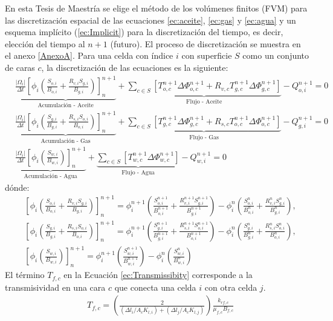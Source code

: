 En esta Tesis de Maestría se elige el método de los volúmenes finitos (FVM) para las discretización espacial de las ecuaciones \ref{ec:aceite}, \ref{ec:gas} y \ref{ec:agua} y un esquema implícito (\ref{ec:Implicit}) para la discretización del tiempo, es decir, elección del tiempo al $n+1$ (futuro). El proceso de discretización se muestra en el anexo \ref{AnexoA}. Para una celda con índice $i$ con superficie $S$ como un conjunto de caras $c$, la discretización de las ecuaciones es la siguiente:
\begin{align}
\label{ec:aceiteDiscretizacion}&\underbrace{\frac{|\Omega_{i}|}{\Delta t}\left[ \phi_{i} \left( \frac{S_{o,i}}{B_{o,i}} + \frac{R_{v,i}S_{g,i}}{B_{g,i}}\right)\right]^{n+1}_{n}}_{\text{Acumulación - Aceite}} + 
\underbrace{\sum_{c \in S}\left[ T^{n+1}_{o,c} \Delta{\Phi_{o,c}^{n+1}} + R_{v,c}T^{n+1}_{g,c} \Delta{\Phi_{g,c}^{n+1}} \right] }_{\text{Flujo - Aceite}} - Q_{o,i}^{n+1} = 0 \\
\label{ec:gasDiscretizacion}&\underbrace{\frac{|\Omega_{i}|}{\Delta t}\left[ \phi_{i} \left( \frac{S_{g,i}}{B_{g,i}} + \frac{R_{s,i}S_{o,i}}{B_{o,i}}\right)\right]^{n+1}_{n}}_{\text{Acumulación - Gas}} + 
\underbrace{\sum_{c \in S}\left[ T^{n+1}_{g,c}\Delta{\Phi_{g,c}^{n+1} + R_{s,c}T^{n+1}_{o,c} \Delta{\Phi_{o,c}^{n+1}}} \right] }_{\text{Flujo - Gas}} - Q_{g,i}^{n+1} = 0 \\
\label{ec:aguaDiscretizacion}&\underbrace{\frac{|\Omega_{i}|}{\Delta t}\left[ \phi_{i} \left( \frac{S_{w,i}}{B_{w,i}}\right)\right]^{n+1}_{n}}_{\text{Acumulación - Agua}}
+ 
\underbrace{\sum_{c \in S}\left[ T^{n+1}_{w,c}\Delta{\Phi_{w,c}^{n+1}} \right]}_{\text{Flujo - Agua}} - Q_{w,i}^{n+1} = 0 
\end{align}
dónde:
\begin{align*}
	&\left[ \phi_{i} \left( \frac{S_{o,i}}{B_{o,i}} + \frac{R_{v,i}S_{g,i}}{B_{g,i}}\right)\right]^{n+1}_{n} = 
	\phi^{n+1}_{i} \left( \frac{S_{o,i}^{n+1}}{B_{o,i}^{n+1}} + \frac{R_{v,i}^{n+1}S_{g,i}^{n+1}}{B_{g,i}^{n+1}}\right) - \phi^{n}_{i} \left( \frac{S_{o,i}^{n}}{B_{o,i}^{n}} + \frac{R_{v,i}^{n}S_{g,i}^{n}}{B_{g,i}^{n}}\right),\\
	&\left[ \phi_{i} \left( \frac{S_{g,i}}{B_{g,i}} + \frac{R_{s,i}S_{o,i}}{B_{o,i}}\right)\right]^{n+1}_{n} = 
	\phi^{n+1}_{i} \left( \frac{S_{g,i}^{n+1}}{B_{g,i}^{n+1}} + \frac{R_{s,i}^{n+1}S_{o,i}^{n+1}}{B_{o,i}^{n+1}}\right) - \phi^{n}_{i} \left( \frac{S_{g,i}^{n}}{B_{g,i}^{n}} + \frac{R_{s,i}^{n}S_{o,i}^{n}}{B_{o,i}^{n}}\right),\\
	&\left[ \phi_{i} \left( \frac{S_{w,i}}{B_{w,i}}\right)\right]^{n+1}_{n} = 
	\phi^{n+1}_{i} \left( \frac{S_{w,i}^{n+1}}{B_{w,i}^{n+1}}\right) - \phi^{n}_{i} \left( \frac{S_{w,i}^{n}}{B_{w,i}^{n}}\right)
\end{align*}
El término $T_{f,c}$ en la Ecuación \ref{ec:Transmissibity} corresponde a la transmisividad en una cara $c$ que conecta una celda $i$ con otra celda $j$.
\begin{align}
	\label{ec:Transmissibity}& T_{f,c} = \left(\frac{2}{(\Delta l_{i}/A_{c}K_{l,i})+(\Delta l_{j}/A_{c}K_{l,j})}\right)\frac{k_{rf,c}}{\mu_{f,c}B_{f,c}}
\end{align}

